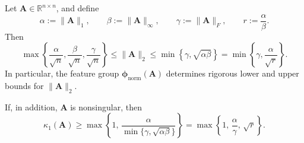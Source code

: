 \documentclass[10pt,a4paper]{amsart}
\begin{document}
\begin{theorem}
\label{thm:norm_feature_bounds}
Let $\mathbf{A}\in\mathbb{R}^{n\times n}$, and define
\begin{equation*}
\alpha:=\|\mathbf{A}\|_1,\qquad
\beta:=\|\mathbf{A}\|_\infty,\qquad
\gamma:=\|\mathbf{A}\|_F,\qquad
r:=\frac{\alpha}{\beta}.
\end{equation*}
Then
\begin{equation}
\label{eq:two_norm_interval}
\max\!\left\{\frac{\alpha}{\sqrt{n}},\frac{\beta}{\sqrt{n}},\frac{\gamma}{\sqrt{n}}\right\}
\le
\|\mathbf{A}\|_2
\le
\min\!\left\{\gamma,\sqrt{\alpha\beta}\right\}
=
\min\!\left\{\gamma,\frac{\alpha}{\sqrt{r}}\right\}.
\end{equation}
In particular, the feature group $\bm{\phi}_{\mathrm{norm}}(\mathbf{A})$ determines rigorous lower and upper bounds for $\|\mathbf{A}\|_2$.

If, in addition, $\mathbf{A}$ is nonsingular, then
\begin{equation}
\label{eq:kappa1_lower_from_norm_features}
\kappa_1(\mathbf{A})
\ge
\max\!\left\{
1,\,
\frac{\alpha}{\min\{\gamma,\sqrt{\alpha\beta}\}}
\right\}
=
\max\!\left\{
1,\,
\frac{\alpha}{\gamma},\,
\sqrt{r}
\right\}.
\end{equation}
\end{theorem}
\end{document}
